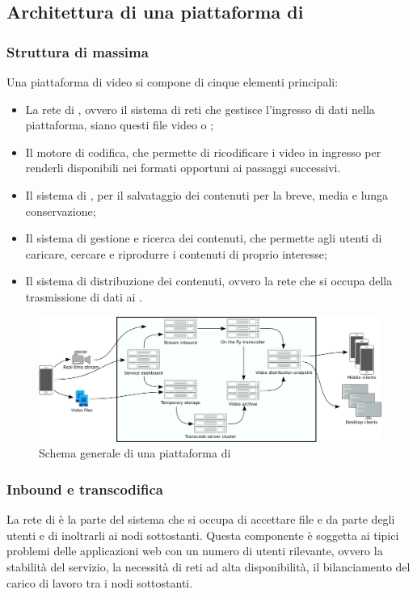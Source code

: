 	\subsection{Architettura di una piattaforma di }
		\subsubsection{Struttura di massima}
			Una piattaforma di video  si compone di cinque elementi principali:
			\begin{itemize}
			\item La rete di , ovvero il sistema di reti che gestisce l'ingresso di dati nella piattaforma, siano questi file video o ;
			\item Il motore di codifica, che permette di ricodificare i video in ingresso per renderli disponibili nei formati opportuni ai passaggi successivi.
			\item Il sistema di , per il salvataggio dei contenuti per la breve, media e lunga conservazione;
			\item Il sistema di gestione e ricerca dei contenuti, che permette agli utenti di caricare, cercare e riprodurre i contenuti di proprio interesse;
			\item Il sistema di distribuzione dei contenuti, ovvero la rete che si occupa della trasmissione di dati ai .
			\end{itemize}

			\begin{figure}[H]
				\begin{center}
					\includegraphics[width=16.5cm,keepaspectratio]{immagini/schema-architettura-piattaforma-streaming}
					\caption{Schema generale di una piattaforma di }
				\end{center}
			\end{figure}

		\subsubsection{Inbound e transcodifica}
			La rete di  è la parte del sistema che si occupa di accettare file e  da parte degli utenti e di inoltrarli ai nodi sottostanti. Questa componente è soggetta ai tipici problemi delle applicazioni web con un numero di utenti rilevante, ovvero la stabilità del servizio, la necessità di reti ad alta disponibilità, il bilanciamento del carico di lavoro tra i nodi sottostanti.
